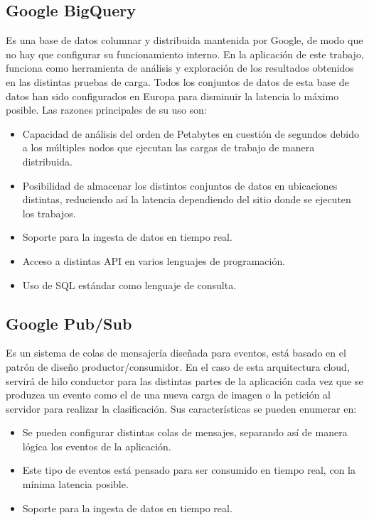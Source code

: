 \subsection{Google BigQuery}\label{subsec:bigquery}
Es una base de datos columnar y distribuida mantenida por Google, de modo que no hay que configurar su funcionamiento interno.
En la aplicación de este trabajo,  funciona como herramienta de análisis y exploración de los resultados obtenidos en las distintas pruebas de carga.
Todos los conjuntos de datos de esta base de datos han sido configurados en Europa para disminuir la latencia lo máximo posible.
Las razones principales de su uso son:
\begin{itemize}
    \item Capacidad de análisis del orden de Petabytes en cuestión de segundos debido a los múltiples nodos que ejecutan las cargas de trabajo de manera distribuida.
    \item Posibilidad de almacenar los distintos conjuntos de datos en ubicaciones distintas, reduciendo así la latencia dependiendo del sitio donde se ejecuten los trabajos.
    \item Soporte para la ingesta de datos en tiempo real.
    \item Acceso a distintas API en varios lenguajes de programación.
    \item Uso de SQL\cite{sql} estándar como lenguaje de consulta.
\end{itemize}

\subsection{Google Pub/Sub}\label{subsec:pubsub}
Es un sistema de colas de mensajería diseñada para eventos,
está basado en el patrón de diseño productor/consumidor.
En el caso de esta arquitectura cloud, servirá de hilo conductor para las distintas partes de la aplicación cada vez que se produzca un evento como el de una nueva carga de imagen o la petición al servidor para realizar la clasificación.
Sus características se pueden enumerar en:

\begin{itemize}
    \item Se pueden configurar distintas colas de mensajes, separando así de manera lógica los eventos de la aplicación.
    \item Este tipo de eventos está pensado para ser consumido en tiempo real, con la mínima latencia posible.
    \item Soporte para la ingesta de datos en tiempo real.
\end{itemize}

